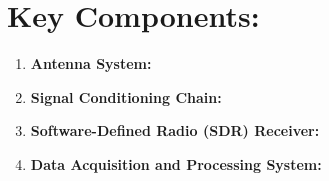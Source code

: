 \documentclass[12pt]{report}
\begin{document}
\section*{Key Components: }
\begin{enumerate}
    \item \textbf{Antenna System:} \\
    \item \textbf{Signal Conditioning Chain:} \\
    \item \textbf{Software-Defined Radio (SDR) Receiver:} \\
    \item \textbf{Data Acquisition and Processing System:} \\
\end{enumerate}
\end{document}
